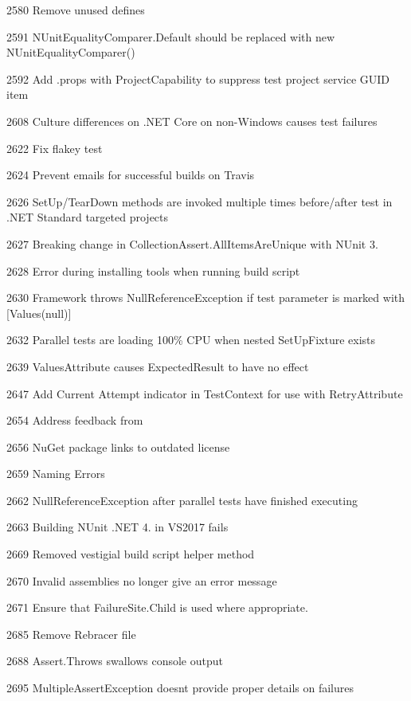 \begin{DoxyItemize}
\item 2580 Remove unused defines
\item 2591 N\+Unit\+Equality\+Comparer.\+Default should be replaced with new N\+Unit\+Equality\+Comparer()
\item 2592 Add .props with Project\+Capability to suppress test project service G\+U\+ID item
\item 2608 Culture differences on .N\+ET Core on non-\/\+Windows causes test failures
\item 2622 Fix flakey test
\item 2624 Prevent emails for successful builds on Travis
\item 2626 Set\+Up/\+Tear\+Down methods are invoked multiple times before/after test in .N\+ET Standard targeted projects
\item 2627 Breaking change in Collection\+Assert.\+All\+Items\+Are\+Unique with N\+Unit 3.
\item 2628 Error during installing tools when running build script
\item 2630 Framework throws Null\+Reference\+Exception if test parameter is marked with \mbox{[}Values(null)\mbox{]}
\item 2632 Parallel tests are loading 100\% C\+PU when nested Set\+Up\+Fixture exists
\item 2639 Values\+Attribute causes Expected\+Result to have no effect
\item 2647 Add Current Attempt indicator in Test\+Context for use with Retry\+Attribute
\item 2654 Address feedback from 
\item 2656 Nu\+Get package links to outdated license
\item 2659 Naming Errors
\item 2662 Null\+Reference\+Exception after parallel tests have finished executing
\item 2663 Building N\+Unit .N\+ET 4. in V\+S2017 fails
\item 2669 Removed vestigial build script helper method
\item 2670 Invalid assemblies no longer give an error message
\item 2671 Ensure that Failure\+Site.\+Child is used where appropriate.
\item 2685 Remove Rebracer file
\item 2688 Assert.\+Throws swallows console output
\item 2695 Multiple\+Assert\+Exception doesn\textquotesingle{}t provide proper details on failures

\end{DoxyItemize}
